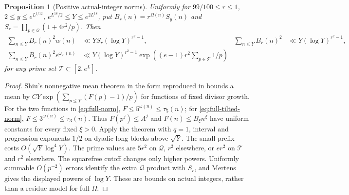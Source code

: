 \documentclass[11pt]{article}
\newtheorem{proposition}[theorem]{Proposition}
\theoremstyle{definition}
\theoremstyle{remark}
\numberwithin{equation}{section}
\newcommand{\Qset}{\mathcal Q}
\begin{document}
\begin{proposition}[Positive actual-integer norms]\label{prop:full-norm}
Uniformly for $99/100\le r\le1$, $2\le y\le e^{L^{1/12}}$,
$e^{L^{18}/2}\le Y\le e^{2L^{18}}$, put $B_r(n)=r^{\Omega(n)}S_y(n)$ and
$S_r=\prod_{p\in\Qset}(1+4r^2/p)$. Then
\begin{align}
 \sum_{n\le Y}B_r(n)^2w(n)&\ll YS_r(\log Y)^{r^2-1},&
 \sum_{n\le Y}B_r(n)^2&\ll Y(\log Y)^{r^2-1},\label{eq:full-norm}\\
 \sum_{n\le Y}B_r(n)^2e^{\omega_{\mathcal T}(n)}
 &\ll Y(\log Y)^{r^2-1}
 \exp\left((e-1)r^2\sum_{p\in\mathcal T}1/p\right)&&\label{eq:full-tilted-norm}
\end{align}
for any prime set $\mathcal T\subset[2,e^L]$.
\end{proposition}
\begin{proof}
Shiu's nonnegative mean theorem in the form reproduced in \cite[p.~1]{Henriot} bounds a mean by
$CY\exp(\sum_{p\le Y}(F(p)-1)/p)$ for functions of fixed divisor growth.
For the two functions in \eqref{eq:full-norm}, $F\le5^{\omega(n)}\le\tau_5(n)$; for
\eqref{eq:full-tilted-norm}, $F\le3^{\omega(n)}\le\tau_3(n)$.
Thus $F(p^j)\le A^j$ and $F(n)\le B_\xi n^\xi$ have uniform constants for every fixed $\xi>0$.
Apply the theorem with $q=1$, interval and progression exponents $1/2$ on dyadic long blocks above $\sqrt Y$.
The small prefix costs $O(\sqrt Y\log^4Y)$.
The prime values are $5r^2$ on $\Qset$, $r^2$ elsewhere, or $er^2$ on $\mathcal T$ and $r^2$ elsewhere.
The squarefree cutoff changes only higher powers. Uniformly summable $O(p^{-2})$ errors identify the extra
$\Qset$ product with $S_r$, and Mertens gives the displayed powers of $\log Y$.
These are bounds on actual integers, rather than a residue model for full $\Omega$.
\end{proof}
\end{document}
